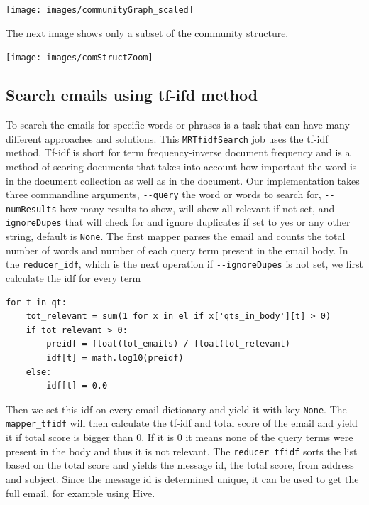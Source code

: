 \documentclass[runningheads,a4paper]{llncs}
\begin{document}
\begin{center}
		\texttt{[image: images/communityGraph\_scaled]}
\end{center}

The next image shows only a subset of the community structure. 

\begin{center}
		\texttt{[image: images/comStructZoom]}
\end{center}


\subsection{Search emails using tf-ifd method}
\label{sec:tfids}
To search the emails for specific words or phrases is a task that can have many different approaches and solutions. This  \verb!MRTfidfSearch! job uses the tf-idf method. Tf-idf is short for term frequency-inverse document frequency \cite{wikiTFIDF} and is a method of scoring documents that takes into account how important the word is in the document collection as well as in the document.
\newline
Our implementation takes three commandline arguments, \verb!--query! the word or words to search for, \verb!--numResults! how many results to show, will show all relevant if not set, and \verb!--ignoreDupes! that will check for and ignore duplicates if set to yes or any other string, default is \verb!None!.
\newline
The first mapper parses the email and counts the total number of words and number of each query term present in the email body.
\newline 
In the \verb!reducer_idf!, which is the next operation if \verb!--ignoreDupes! is not set, we first calculate the idf for every term
\begin{verbatim}
for t in qt:
    tot_relevant = sum(1 for x in el if x['qts_in_body'][t] > 0)
    if tot_relevant > 0:
        preidf = float(tot_emails) / float(tot_relevant)
        idf[t] = math.log10(preidf)
    else:
        idf[t] = 0.0
\end{verbatim}
Then we set this idf on every email dictionary and yield it with key \verb!None!. The \verb!mapper_tfidf! will then calculate the tf-idf and total score of the email and yield it if total score is bigger than 0. If it is 0 it means none of the query terms were present in the body and thus it is not relevant.
\newline
The \verb!reducer_tfidf! sorts the list based on the total score and yields the message id, the total score, from address and subject. Since the message id is determined unique, it can be used to get the full email, for example using Hive.
\end{document}
